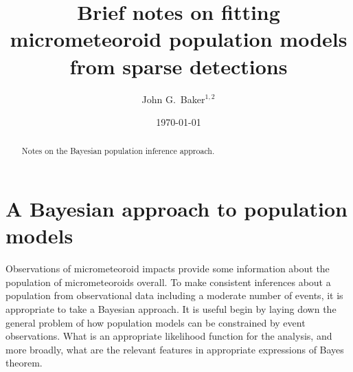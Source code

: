 \documentclass[twocolumn,showpacs,aps,prd,nobibnotes,nofootinbib,floatfix]{revtex4-1}
\begin{document}
\date{\today}
\title{Brief notes on fitting micrometeoroid population models from sparse detections}
\author{John G.~Baker$^{1,2}$}

\begin{abstract}
  Notes on the Bayesian population inference approach.
\end{abstract}

\maketitle
\section{A Bayesian approach to population models}
Observations of micrometeoroid impacts provide some information about the population of micrometeoroids overall.  To make consistent inferences about a population from observational data including a moderate number of events, it is appropriate to take a Bayesian approach.  It is useful begin by laying down the general problem of how population models can be constrained by event observations. What is an appropriate likelihood function for the analysis, and more broadly, what are the relevant features in appropriate expressions of Bayes theorem.  
\end{document}
